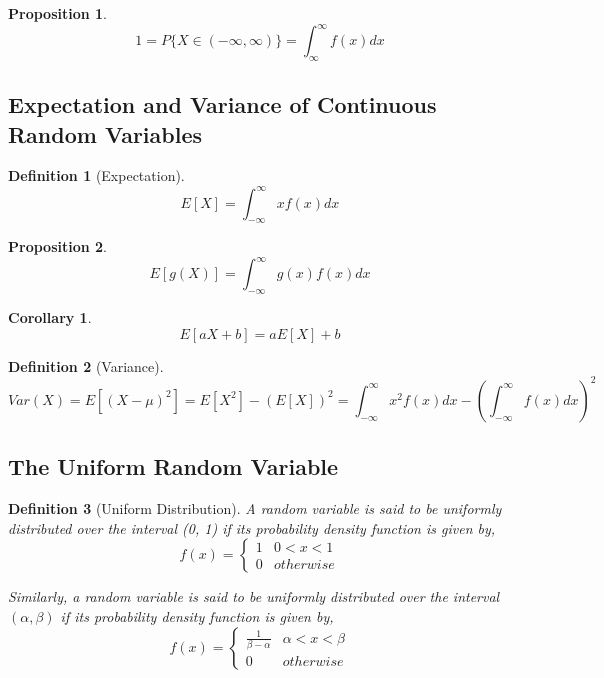 \documentclass[12pt]{article}
\newtheorem{definition}{Definition}[subsection]
\newtheorem{proposition}{Proposition}[subsection]
\newtheorem{corollary}{Corollary}[subsection]
\begin{document}
            \begin{proposition}
                \[1 = P\{X \in (-\infty, \infty)\} = \int^{\infty}_{\infty}f(x)dx\]
            \end{proposition}
        \subsection{Expectation and Variance of Continuous Random Variables}
            \begin{definition}[Expectation]
                \[E[X] = \int^{\infty}_{-\infty}xf(x)dx\]
            \end{definition}

            \begin{proposition}
                \[E[g(X)] = \int_{-\infty}^{\infty}g(x)f(x)dx\]
            \end{proposition}

            \begin{corollary}
                \[E[aX + b] = aE[X] + b\]
            \end{corollary}

            \begin{definition}[Variance]
                \[Var(X) = E[(X - \mu)^2] = E[X^2]-(E[X])^2 = \int_{-\infty}^{\infty}x^2f(x)dx - (\int_{-\infty}^{\infty}f(x)dx)^2\]
            \end{definition}

        \subsection{The Uniform Random Variable}
            \begin{definition}[Uniform Distribution]
                A random variable is said to be uniformly distributed over the interval (0, 1) if its probability density function is given by,
                \[f(x) = \left\{\begin{array}{ll} 1 & 0 < x < 1 \\ 0 & otherwise \end{array}\right.\]

                Similarly, a random variable is said to be uniformly distributed over the interval $(\alpha, \beta)$ if its probability density function is given by,
                \[f(x) = \left\{\begin{array}{ll} \frac{1}{\beta - \alpha} & \alpha < x < \beta \\ 0 & otherwise \end{array}\right.\]
            \end{definition}
\end{document}
